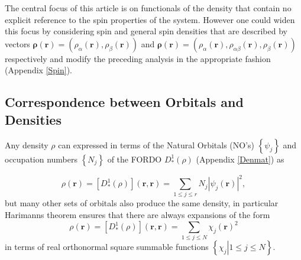 \documentclass[aps,preprint]{revtex4}%
\begin{document}
The central focus of this article is on functionals of the density that
contain no explicit reference to the spin properties of the system. However
one could widen this focus by considering spin and general spin densities that
are described by vectors $\boldsymbol{\rho}\left(  \boldsymbol{r}\right)
=\left(  \rho_{\alpha}\left(  \boldsymbol{r}\right)  ,\rho_{\beta}\left(
\boldsymbol{r}\right)  \right)  $ and $\boldsymbol{\rho}\left(  \boldsymbol{r}%
\right)  =\left(  \rho_{\alpha}\left(  \boldsymbol{r}\right)  ,\rho
_{\alpha\beta}\left(  \boldsymbol{r}\right)  ,\rho_{\beta}\left(
\boldsymbol{r}\right)  \right)  $ respectively and modify the preceding
analysis in the appropriate fashion (Appendix \ref{Spin}).

\subsection{Correspondence between Orbitals and Densities\label{Orb_Den}}

Any density $\rho$ can expressed in terms of the Natural Orbitals (NO's)
$\left\{  \psi_{j}\right\}  $ and occupation numbers $\left\{  N_{j}\right\}
$ of the FORDO $D_{\ast}^{1}\left(  \rho\right)  $ (Appendix \ref{Denmat}) as%

\begin{equation}
\rho\left(  \boldsymbol{r}\right)  =\left[  D_{\ast}^{1}\left(  \rho\right)
\right]  \left(  \boldsymbol{r,r}\right)  =\sum_{1\leq j\leq r}N_{j}\left\vert
\psi_{j}\left(  \boldsymbol{r}\right)  \right\vert ^{2}, \label{NGSOexpan}%
\end{equation}
but many other sets of orbitals also produce the same density, in particular
Harimanns \cite{Harriman81} theorem ensures that there are always expansions
of the form
\begin{equation}
\rho\left(  \boldsymbol{r}\right)  =\left[  D_{\ast}^{1}\left(  \rho\right)
\right]  \left(  \boldsymbol{r,r}\right)  =\sum_{1\leq j\leq N}\chi_{j}\left(
\boldsymbol{r}\right)  ^{2} \label{Genexp}%
\end{equation}
in terms of real orthonormal square summable functions $\left\{  \left.
\chi_{j}\right\vert 1\leq j\leq N\right\}  $.
\end{document}
